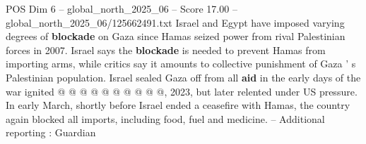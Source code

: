 \begin{textsample}{POS Dim 6 – global\_north\_2025\_06 – Score 17.00 – global\_north\_2025\_06/125662491.txt}
Israel and Egypt have imposed varying degrees of \textbf{blockade} on Gaza since Hamas seized power from rival Palestinian forces in 2007.
Israel says the \textbf{blockade} is needed to prevent Hamas from importing arms, while critics say it amounts to collective punishment of Gaza ' s Palestinian population.
Israel sealed Gaza off from all \textbf{aid} in the early days of the war ignited @ @ @ @ @ @ @ @ @ @, 2023, but later relented under US pressure.
In early March, shortly before Israel ended a ceasefire with Hamas, the country again blocked all imports, including food, fuel and medicine. -- Additional reporting : Guardian

\end{textsample}
